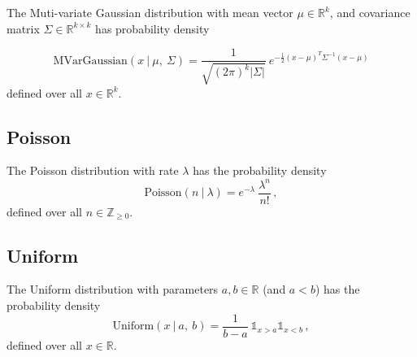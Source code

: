 \documentclass[12pt,letterpaper,onecolumn,oneside]{article}
\begin{document}
\begin{appendices}
The Muti-variate Gaussian distribution with mean vector
$\mu \in \mathbb{R}^k$, and
covariance matrix $\Sigma  \in \mathbb{R}^{k \times k}$ has probability density

\[\text{MVarGaussian}(x \ | \ \mu, \ \Sigma ) = 
\frac{1}{\sqrt{(2 \pi)^k | \Sigma
    |}} \ 
e^{ -\frac{1}{2} (x - \mu)^T \Sigma^{-1} (x - \mu)}
\]
defined over all $x \in \mathbb{R}^k$.

\subsection{Poisson}

The Poisson distribution with rate $\lambda$ has the probability density
\[ \text{Poisson}(n \ | \ \lambda) =  e ^ {-\lambda}  \ 
\frac{  \lambda ^ n  }{n !} \,
, \]
defined over all $n \in \mathbb{Z}_{\ge 0}$.

\subsection{Uniform}

The Uniform distribution with parameters $a, b \in \mathbb{R}$ (and $a <
b$) has the probability density
\[ \text{Uniform}(x \ | \ a, \ b) = \frac{1}{b - a} \ \mathbb{1}_{x>a}
\mathbb{1}_{x<b}\, ,\]
defined over all $x \in \mathbb{R}$.

\end{appendices}



\end{document}
